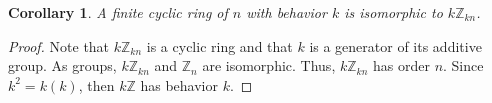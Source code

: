 \documentclass[12pt]{article}
\newtheorem*{cor*}{Corollary}
\begin{document}

\begin{cor*}
A finite cyclic ring of  $n$ with behavior $k$ is isomorphic to $k{\mathbb{Z}}_{kn}$.
\end{cor*}

\begin{proof}
Note that $k{\mathbb{Z}}_{kn}$ is a cyclic ring and that $k$ is a generator of its additive group.  As groups, $k{\mathbb{Z}}_{kn}$ and $\mathbb{Z}_n$ are isomorphic.  Thus, $k{\mathbb{Z}}_{kn}$ has order $n$.  Since $k^2=k(k)$, then $k\mathbb{Z}$ has behavior $k$.
\end{proof}
\end{document}
